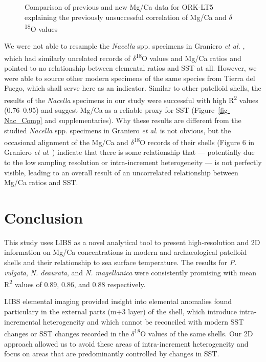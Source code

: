 \documentclass[
  authoryear,
  preprint,
  3p]{elsarticle}
\begin{document}
\begin{figure}


\caption{\label{fig-ORK_sub}Comparison of previous and new Mg/Ca data
for ORK-LT5 explaining the previously unsuccessful correlation of Mg/Ca
and \(\delta\)\textsuperscript{18}O-values}

\end{figure}%

We were not able to resample the \emph{Nacella} spp. specimens in
Graniero \emph{et al.} \citeyearpar{Graniero2017-io}, which had
similarly unrelated records of \(\delta\)\textsuperscript{18}O values
and Mg/Ca ratios and pointed to no relationship between elemental ratios
and SST at all. However, we were able to source other modern specimens
of the same species from Tierra del Fuego, which shall serve here as an
indicator. Similar to other patelloid shells, the results of the
\emph{Nacella} specimens in our study were successful with high
R\textsuperscript{2} values (0.76--0.95) and suggest Mg/Ca as a reliable
proxy for SST (Figure~\ref{fig-Nac_Comp} and supplementaries). Why these
results are different from the studied \emph{Nacella} spp. specimens in
Graniero \emph{et al}. \citeyearpar{Graniero2017-io} is not obvious, but
the occasional alignment of the Mg/Ca and
\(\delta\)\textsuperscript{18}O records of their shells (Figure 6 in
Graniero \emph{et al}. \citeyearpar{Graniero2017-io}) indicate that
there is some relationship that --- potentially due to the low sampling
resolution or intra-increment heterogeneity --- is not perfectly
visible, leading to an overall result of an uncorrelated relationship
between Mg/Ca ratios and SST.

\section{Conclusion}\label{conclusion}

This study uses LIBS as a novel analytical tool to present
high-resolution and 2D information on Mg/Ca concentrations in modern and
archaeological patelloid shells and their relationship to sea surface
temperature. The results for \emph{P. vulgata}, \emph{N. deaurata}, and
\emph{N. magellanica} were consistently promising with mean
R\textsuperscript{2} values of 0.89, 0.86, and 0.88 respectively.

LIBS elemental imaging provided insight into elemental anomalies found
particulary in the external parts (m+3 layer) of the shell, which
introduce intra-incremental heterogeneity and which cannot be reconciled
with modern SST changes or SST changes recorded in the
\(\delta\)\textsuperscript{18}O values of the same shells. Our 2D
approach allowed us to avoid these areas of intra-increment
heterogeneity and focus on areas that are predominantly controlled by
changes in SST.
\end{document}
